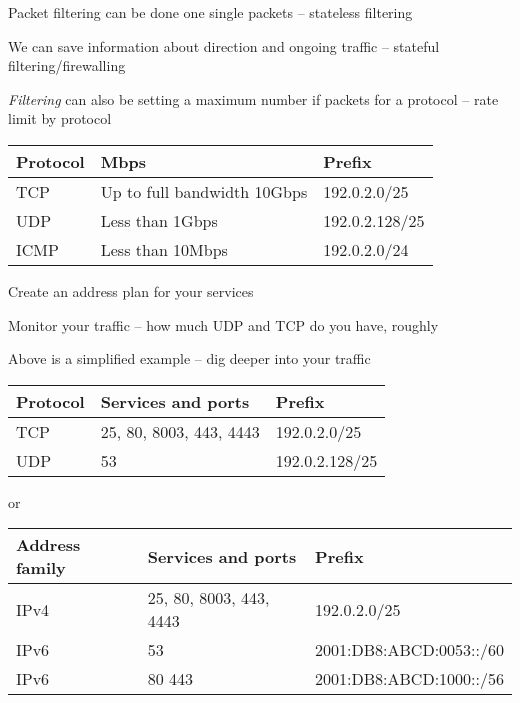 \documentclass[Screen16to9,17pt]{foils}
\begin{document}
\begin{list2}
\item Packet filtering can be done one single packets -- stateless filtering
\item We can save information about direction and ongoing traffic -- stateful filtering/firewalling
\item \emph{Filtering} can also be setting a maximum number if packets for a protocol -- rate limit by protocol
\end{list2}



\begin{tabularx}{\textwidth-5cm}{|p{5cm}|p{7cm}|X|} \hline
{\bf Protocol} & {\bf Mbps} & {\bf Prefix}\\\hline
TCP & Up to full bandwidth 10Gbps & 192.0.2.0/25 \\\hline
UDP & Less than 1Gbps & 192.0.2.128/25 \\\hline
ICMP & Less than 10Mbps & 192.0.2.0/24 \\\hline
\end{tabularx}


\begin{list2}
\item Create an address plan for your services
\item Monitor your traffic -- how much UDP and TCP do you have, roughly

\item Above is a simplified example -- dig deeper into your traffic
\end{list2}


\begin{tabularx}{\textwidth-5cm}{|p{5cm}|p{7cm}|X|} \hline
{\bf Protocol} & {\bf Services and ports} & {\bf Prefix}\\\hline
TCP & 25, 80, 8003, 443, 4443 & 192.0.2.0/25 \\\hline
UDP & 53 & 192.0.2.128/25 \\\hline
\end{tabularx}

or

\begin{tabularx}{\textwidth-5cm}{|p{5cm}|p{7cm}|X|} \hline
{\bf Address family} & {\bf Services and ports} & {\bf Prefix}\\\hline
IPv4 & 25, 80, 8003, 443, 4443 & 192.0.2.0/25 \\\hline
IPv6 & 53  & 2001:DB8:ABCD:0053::/60 \\\hline
IPv6 & 80 443 & 2001:DB8:ABCD:1000::/56 \\\hline
\end{tabularx}
\end{document}
